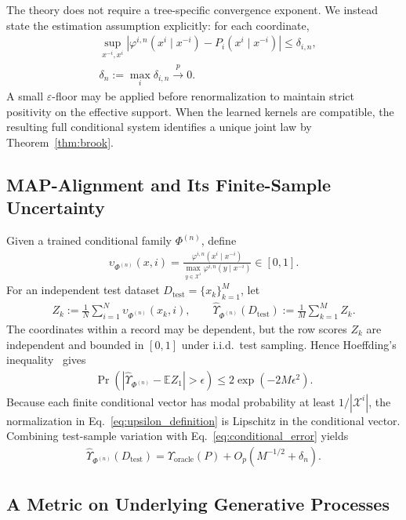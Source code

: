 \documentclass[runningheads]{llncs}
\def\EQSP{3pt}
\newcommand{\cgather}[2][\EQSP]{\begingroup\setlength\abovedisplayskip{#1}\setlength\belowdisplayskip{#1}\begin{gather} #2 \end{gather}\endgroup\noindent}
\begin{document}
The theory does not require a tree-specific convergence exponent. We instead
state the estimation assumption explicitly: for each coordinate,
\begin{equation}
\begin{aligned}
&\sup_{x^{-i},x^i}
\left|\varphi^{i,n}(x^i\mid x^{-i})-P_i(x^i\mid x^{-i})\right|
\leq \delta_{i,n},\\
&\delta_n:=\max_i\delta_{i,n}\xrightarrow{p}0.
\end{aligned}
\label{eq:conditional_error}
\end{equation}
A small $\varepsilon$-floor may be applied before renormalization to maintain
strict positivity on the effective support. When the learned kernels are
compatible, the resulting full conditional system identifies a unique joint
law by Theorem~\ref{thm:brook}.

\subsection{MAP-Alignment and Its Finite-Sample Uncertainty}

Given a trained conditional family $\Phi^{(n)}$, define
\cgather{
\upsilon_{\Phi^{(n)}}(x,i)
=
\frac{\varphi^{i,n}(x^i\mid x^{-i})}
{\max_{y\in\mathcal{X}^i}\varphi^{i,n}(y\mid x^{-i})}
\in[0,1].
\label{eq:upsilon_definition}
}
For an independent test dataset $D_{\mathrm{test}}=\{x_k\}_{k=1}^M$, let
\cgather{
Z_k:=\frac{1}{N}\sum_{i=1}^N
\upsilon_{\Phi^{(n)}}(x_k,i),
\qquad
\hat\Upsilon_{\Phi^{(n)}}(D_{\mathrm{test}})
:=\frac{1}{M}\sum_{k=1}^M Z_k.
\label{eq:upsilon_empirical}
}
The coordinates within a record may be dependent, but the row scores $Z_k$ are
independent and bounded in $[0,1]$ under i.i.d.\ test sampling. Hence
Hoeffding's inequality~\cite{hoeffding1963} gives
\cgather{
\Pr\left(
\left|\hat\Upsilon_{\Phi^{(n)}}-\mathbb{E}Z_1\right|>\epsilon
\right)
\leq 2\exp(-2M\epsilon^2).
\label{eq:upsilon_hoeffding}
}
Because each finite conditional vector has modal probability at least
$1/|\mathcal{X}^i|$, the normalization in
Eq.~\eqref{eq:upsilon_definition} is Lipschitz in the conditional vector. Combining test-sample variation with
Eq.~\eqref{eq:conditional_error} yields
\cgather{
\hat\Upsilon_{\Phi^{(n)}}(D_{\mathrm{test}})
=
\Upsilon_{\mathrm{oracle}}(P)
+O_p\!\left(M^{-1/2}+\delta_n\right).
\label{eq:upsilon_full_uncertainty}
}

\subsection{A Metric on Underlying Generative Processes}
\end{document}

